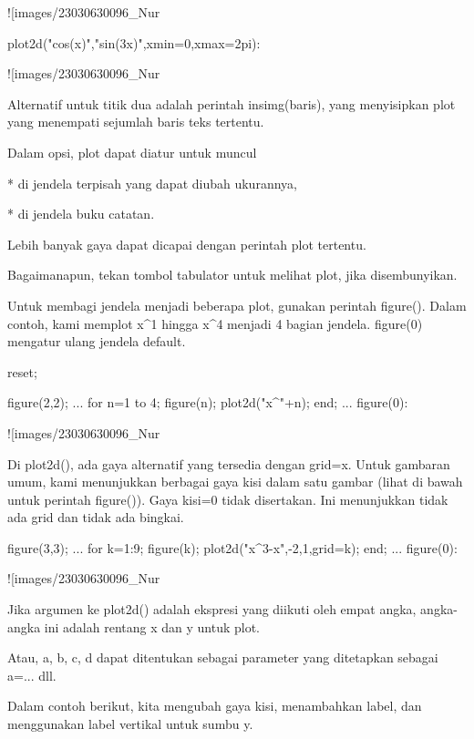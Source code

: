 \documentclass{article}
\begin{document}
![images/23030630096_Nur%

\>plot2d("cos(x)","sin(3\*x)",xmin=0,xmax=2pi):


![images/23030630096_Nur%

Alternatif untuk titik dua adalah perintah insimg(baris), yang
menyisipkan plot yang menempati sejumlah baris teks tertentu.


Dalam opsi, plot dapat diatur untuk muncul


* 
di jendela terpisah yang dapat diubah ukurannya,

* 
di jendela buku catatan.


Lebih banyak gaya dapat dicapai dengan perintah plot tertentu.


Bagaimanapun, tekan tombol tabulator untuk melihat plot, jika
disembunyikan.


Untuk membagi jendela menjadi beberapa plot, gunakan perintah
figure(). Dalam contoh, kami memplot x^1 hingga x^4 menjadi 4 bagian
jendela. figure(0) mengatur ulang jendela default.


\>reset;

\>figure(2,2); ...  
\>   for n=1 to 4; figure(n); plot2d("x^"+n); end; ...  
\>   figure(0):


![images/23030630096_Nur%

Di plot2d(), ada gaya alternatif yang tersedia dengan grid=x. Untuk
gambaran umum, kami menunjukkan berbagai gaya kisi dalam satu gambar
(lihat di bawah untuk perintah figure()). Gaya kisi=0 tidak
disertakan. Ini menunjukkan tidak ada grid dan tidak ada bingkai.


\>figure(3,3); ...  
\>   for k=1:9; figure(k); plot2d("x^3-x",-2,1,grid=k); end; ...  
\>   figure(0):


![images/23030630096_Nur%

Jika argumen ke plot2d() adalah ekspresi yang diikuti oleh empat
angka, angka-angka ini adalah rentang x dan y untuk plot.


Atau, a, b, c, d dapat ditentukan sebagai parameter yang ditetapkan
sebagai a=... dll.


Dalam contoh berikut, kita mengubah gaya kisi, menambahkan label, dan
menggunakan label vertikal untuk sumbu y.
\end{document}
